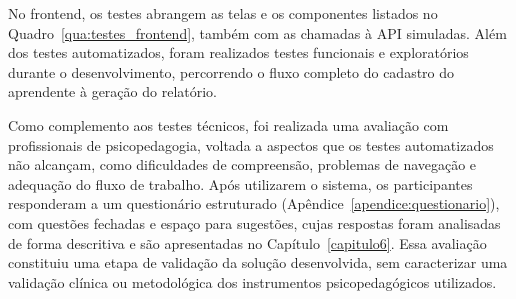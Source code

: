 No frontend, os testes abrangem as telas e os componentes listados no Quadro~\ref{qua:testes_frontend}, também com as chamadas à API simuladas. Além dos testes automatizados, foram realizados testes funcionais e exploratórios durante o desenvolvimento, percorrendo o fluxo completo do cadastro do aprendente à geração do relatório.

Como complemento aos testes técnicos, foi realizada uma avaliação com profissionais de psicopedagogia, voltada a aspectos que os testes automatizados não alcançam, como dificuldades de compreensão, problemas de navegação e adequação do fluxo de trabalho. Após utilizarem o sistema, os participantes responderam a um questionário estruturado (Apêndice~\ref{apendice:questionario}), com questões fechadas e espaço para sugestões, cujas respostas foram analisadas de forma descritiva e são apresentadas no Capítulo~\ref{capitulo6}. Essa avaliação constituiu uma etapa de validação da solução desenvolvida, sem caracterizar uma validação clínica ou metodológica dos instrumentos psicopedagógicos utilizados.
